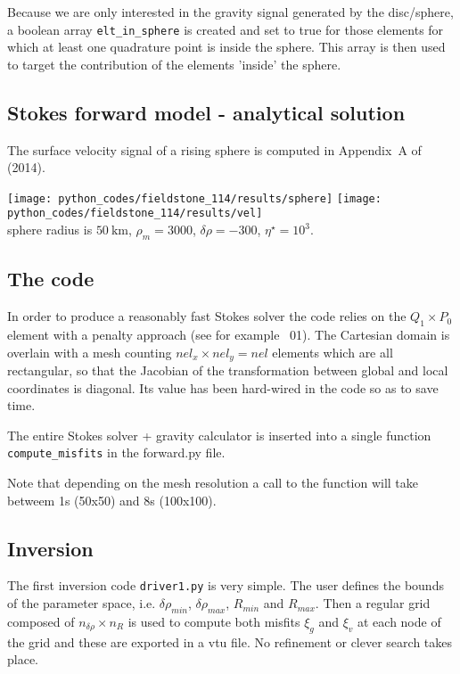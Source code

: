 Because we are only interested in the gravity signal generated by the disc/sphere, 
a boolean array {\tt elt\_in\_sphere} is created and set to true for those elements
for which at least one quadrature point is inside the sphere. This array is then used
to target the contribution of the elements 'inside' the sphere. 



\subsection*{Stokes forward model - analytical solution}

The surface velocity signal of a rising sphere is computed in Appendix~A of \textcite{bakp14} (2014).

\begin{center}
\texttt{[image: python\_codes/fieldstone\_114/results/sphere]}
\texttt{[image: python\_codes/fieldstone\_114/results/vel]}\\
{\captionfont sphere radius is $50~\si{\km}$, $\rho_m=3000$, $\delta\rho=-300$, $\eta^\star=10^3$.}
\end{center}

\textcite{burg16}

\subsection*{The code}

In order to produce a reasonably fast Stokes solver the code relies on 
the $Q_1\times P_0$ element with a penalty approach (see for example \stone~01).
The Cartesian domain is overlain with a mesh counting $nel_x\times nel_y=nel$
elements which are all rectangular, so that the Jacobian of the transformation
between global and local coordinates is diagonal. Its value has been 
hard-wired in the code so as to save time. 

The entire Stokes solver + gravity calculator is inserted into a single function
{\tt compute\_misfits} in the {\pythonfile forward.py} file.

Note that depending on the mesh resolution a call to the function will take betweem 1s 
(50x50) and 8s (100x100). 


\subsection*{Inversion}

The first inversion code {\tt driver1.py} is very simple. The user defines the bounds of the 
parameter space, i.e. $\delta\rho_{min}$, $\delta\rho_{max}$, $R_{min}$ and $R_{max}$.
Then a regular grid composed of $n_{\delta\rho} \times n_{R}$ is used to compute 
both misfits $\xi_g$ and $\xi_v$ at each node of the grid and these are 
exported in a vtu file. No refinement or clever search takes place. 









